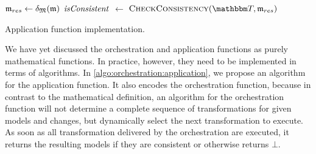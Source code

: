 \begin{algorithm}
\begin{algorithmic}[1]
            \State $\mathfrak{m}_{res} \leftarrow \mathfrak{\delta}_{\mathfrak{M}}(\mathfrak{m})$ %
            \State $\mathit{isConsistent}$ $\leftarrow$ $\function{CheckConsistency}(\transformationset{T}, \modeltuple{m}_{res})$ \label{algo:orchestration:application:line:startconsistencycheck}
                \State \Return{$\bot$}
            \EndIf \label{algo:orchestration:application:line:endconsistencycheck}
            \State {} \label{algo:orchestration:application:line:returnresult}
        \EndProcedure
    \end{algorithmic}
    \caption[Application function implementation]{Application function implementation.}
    \label{algo:orchestration:application}
\end{algorithm}

We have yet discussed the orchestration and application functions as purely mathematical functions.
In practice, however, they need to be implemented in terms of algorithms.
In \autoref{algo:orchestration:application}, we propose an algorithm for the application function.
It also encodes the orchestration function, because in contrast to the mathematical definition, an algorithm for the orchestration function will not determine a complete sequence of transformations for given models and changes, but dynamically select the next transformation to execute.
As soon as all transformation delivered by the orchestration are executed, it returns the resulting models if they are consistent or otherwise returns $\bot$.

